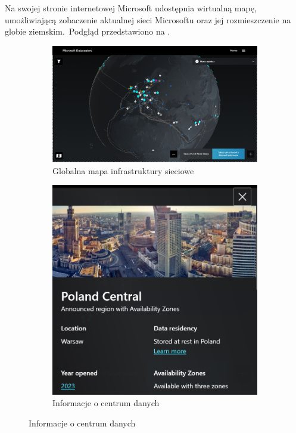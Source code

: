 Na swojej stronie internetowej Microsoft udostępnia wirtualną mapę, umożliwiającą zobaczenie aktualnej sieci Microsoftu oraz jej rozmieszczenie na globie ziemskim.\ Podgląd przedstawiono na .
\vfill
\pagebreak

\begin{figure}[H]
    \begin{subfigure}[m]{0.7\textwidth}
    \includegraphics[width=\textwidth]{images/azure-ic}
    \caption{Globalna mapa infrastruktury sieciowe}
    \end{subfigure}
    \hfill
    \begin{subfigure}[m]{0.25\textwidth}
        \includegraphics[width=\textwidth]{images/azure-pl}
        \caption{Informacje o centrum danych}
    \end{subfigure}
    \label{fig:azure-ic}
\end{figure}

